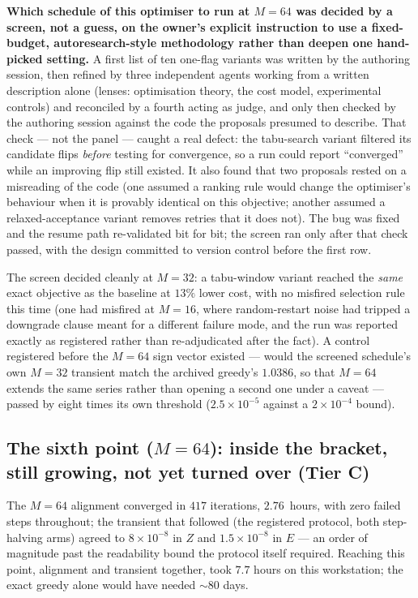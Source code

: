 \documentclass[11pt,a4paper]{article}
\newcommand{\tC}{\textcolor{TierC}{\textbf{Tier C}}}
\theoremstyle{definition}
\theoremstyle{plain}
\begin{document}
\textbf{Which schedule of this optimiser to run at $M=64$ was decided by a screen, not a guess,
on the owner's explicit instruction to use a fixed-budget, autoresearch-style methodology
rather than deepen one hand-picked setting.} A first list of ten one-flag variants was written
by the authoring session, then refined by three independent agents working from a written
description alone (lenses: optimisation theory, the cost model, experimental controls) and
reconciled by a fourth acting as judge, and only then checked by the authoring session against
the code the proposals presumed to describe. That check --- not the panel --- caught a real defect: the
tabu-search variant filtered its candidate flips \emph{before} testing for convergence, so a run
could report ``converged'' while an improving flip still existed. It also found that two
proposals rested on a misreading of the code (one assumed a ranking rule would change the
optimiser's behaviour when it is provably identical on this objective; another assumed a
relaxed-acceptance variant removes retries that it does not). The bug was fixed and the resume
path re-validated bit for bit; the screen ran only after that check passed, with the design
committed to version control before the first row.

The screen decided cleanly at $M=32$: a tabu-window variant reached the \emph{same} exact
objective as the baseline at $13\%$ lower cost, with no misfired selection rule this time (one
had misfired at $M=16$, where random-restart noise had tripped a downgrade clause meant for a
different failure mode, and the run was reported exactly as registered rather than
re-adjudicated after the fact). A control registered before the $M=64$ sign vector existed ---
would the screened schedule's own $M=32$ transient match the archived greedy's $1.0386$, so that
$M=64$ extends the same series rather than opening a second one under a caveat --- passed by
eight times its own threshold ($2.5\times10^{-5}$ against a $2\times10^{-4}$ bound).

\subsection{The sixth point ($M=64$): inside the bracket, still growing, not yet turned over
(\tC{})}
\label{sec:sixth}

The $M=64$ alignment converged in $417$ iterations, $2.76$~hours, with zero failed steps
throughout; the transient that followed (the registered protocol, both step-halving arms) agreed
to $8\times10^{-8}$ in $Z$ and $1.5\times10^{-8}$ in $E$ --- an order of magnitude past the
readability bound the protocol itself required. Reaching this point, alignment and transient
together, took $7.7$ hours on this workstation; the exact greedy alone would have needed
$\sim80$ days.
\end{document}
